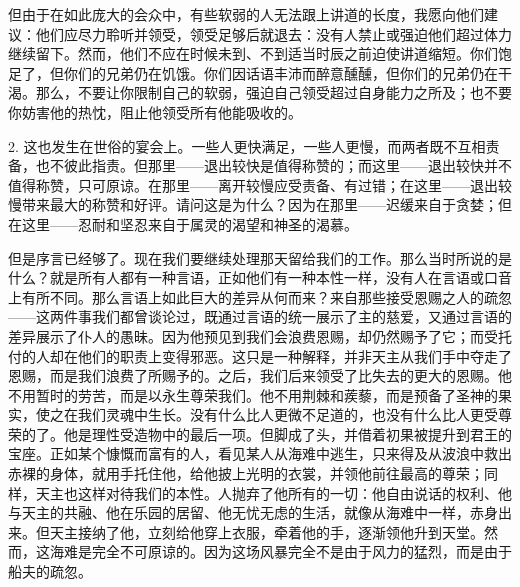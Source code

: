 但由于在如此庞大的会众中，有些软弱的人无法跟上讲道的长度，我愿向他们建议：他们应尽力聆听并领受，领受足够后就退去：没有人禁止或强迫他们超过体力继续留下。然而，他们不应在时候未到、不到适当时辰之前迫使讲道缩短。你们饱足了，但你们的兄弟仍在饥饿。你们因话语丰沛而醉意醺醺，但你们的兄弟仍在干渴。那么，不要让你限制自己的软弱，强迫自己领受超过自身能力之所及；也不要你妨害他的热忱，阻止他领受所有他能吸收的。\par

2. 这也发生在世俗的宴会上。一些人更快满足，一些人更慢，而两者既不互相责备，也不彼此指责。但那里——退出较快是值得称赞的；而这里——退出较快并不值得称赞，只可原谅。在那里——离开较慢应受责备、有过错；在这里——退出较慢带来最大的称赞和好评。请问这是为什么？因为在那里——迟缓来自于贪婪；但在这里——忍耐和坚忍来自于属灵的渴望和神圣的渴慕。\par

但是序言已经够了。现在我们要继续处理那天留给我们的工作。那么当时所说的是什么？就是所有人都有一种言语，正如他们有一种本性一样，没有人在言语或口音上有所不同。那么言语上如此巨大的差异从何而来？来自那些接受恩赐之人的疏忽——这两件事我们都曾谈论过，既通过言语的统一展示了主的慈爱，又通过言语的差异展示了仆人的愚昧。因为他预见到我们会浪费恩赐，却仍然赐予了它；而受托付的人却在他们的职责上变得邪恶。这只是一种解释，并非天主从我们手中夺走了恩赐，而是我们浪费了所赐予的。之后，我们后来领受了比失去的更大的恩赐。他不用暂时的劳苦，而是以永生尊荣我们。他不用荆棘和蒺藜，而是预备了圣神的果实，使之在我们灵魂中生长。没有什么比人更微不足道的，也没有什么比人更受尊荣的了。他是理性受造物中的最后一项。但脚成了头，并借着初果被提升到君王的宝座。正如某个慷慨而富有的人，看见某人从海难中逃生，只来得及从波浪中救出赤裸的身体，就用手托住他，给他披上光明的衣裳，并领他前往最高的尊荣；同样，天主也这样对待我们的本性。人抛弃了他所有的一切：他自由说话的权利、他与天主的共融、他在乐园的居留、他无忧无虑的生活，就像从海难中一样，赤身出来。但天主接纳了他，立刻给他穿上衣服，牵着他的手，逐渐领他升到天堂。然而，这海难是完全不可原谅的。因为这场风暴完全不是由于风力的猛烈，而是由于船夫的疏忽。\par

